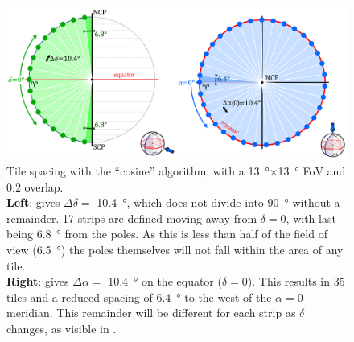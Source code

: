 \begin{colsection}
\begin{colsection}
\begin{figure}[p]
\begin{center}
\includegraphics[width=\linewidth]{images/spacing_cosine.pdf}
\end{center}
\caption[Tile spacing with the ``cosine'' algorithm]{Tile spacing with the ``cosine'' algorithm, with a \SI{13}{\degree}$\times$\SI{13}{\degree} FoV and $0.2$ overlap.
\\
\textbf{Left}:  gives $\Delta\delta = $ \SI{10.4}{\degree}, which does not divide into \SI{90}{\degree} without a remainder. 17 strips are defined moving away from $\delta=0$, with last being \SI{6.8}{\degree} from the poles. As this is less than half of the field of view (\SI{6.5}{\degree}) the poles themselves will not fall within the area of any tile.
\\
\textbf{Right}:  gives $\Delta\alpha = $ \SI{10.4}{\degree} on the equator ($\delta=0$). This results in 35 tiles and a reduced spacing of \SI{6.4}{\degree} to the west of the $\alpha=0$ meridian. This remainder will be different for each strip as $\delta$ changes, as visible in .
}
\label{fig:cosine_spacing}
\end{figure}


\end{colsection}
\end{colsection}
